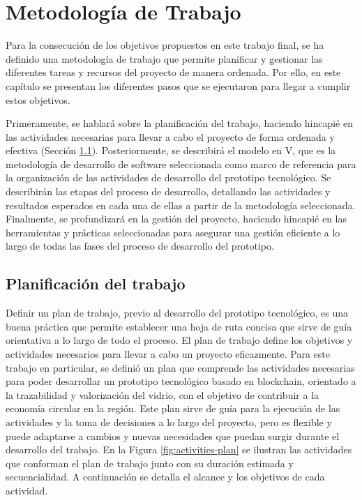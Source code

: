 \chapter[Metodología de trabajo]{Metodología de Trabajo}
\label{cp:methodology}

\parindent0pt

Para la consecución de los objetivos propuestos en este trabajo final, se ha definido una metodología de trabajo que permite planificar y gestionar las diferentes tareas y recursos del proyecto de manera ordenada. Por ello, en este capítulo se presentan los diferentes pasos que se ejecutaron para llegar a cumplir estos objetivos. 

Primeramente, se hablará sobre la planificación del trabajo, haciendo hincapié en las actividades necesarias para llevar a cabo el proyecto de forma ordenada y efectiva (Sección \ref{sec:work-plan}). Posteriormente, se describirá el modelo en V, que es la metodología de desarrollo de software seleccionada como marco de referencia para la organización de las actividades de desarrollo del prototipo tecnológico. Se describirán las etapas del proceso de desarrollo, detallando las actividades y resultados esperados en cada una de ellas a partir de la metodología seleccionada. Finalmente, se profundizará en la gestión del proyecto, haciendo hincapié en las herramientas y prácticas seleccionadas para asegurar una gestión eficiente a lo largo de todas las fases del proceso de desarrollo del prototipo.

\section{Planificación del trabajo}
\label{sec:work-plan}

Definir un plan de trabajo, previo al desarrollo del prototipo tecnológico, es una buena práctica que permite establecer una hoja de ruta concisa que sirve de guía orientativa a lo largo de todo el proceso. El plan de trabajo define los objetivos y actividades necesarios para llevar a cabo un proyecto eficazmente. Para este trabajo en particular, se definió un plan que comprende las actividades necesarias para poder desarrollar un prototipo tecnológico basado en blockchain, orientado a la trazabilidad y valorización del vidrio, con el objetivo de contribuir a la economía circular en la región. Este plan sirve de guía para la ejecución de las actividades y la toma de decisiones a lo largo del proyecto, pero es flexible y puede adaptarse a cambios y nuevas necesidades que puedan surgir durante el desarrollo del trabajo. En la Figura \ref{fig:activities-plan} se ilustran las actividades que conforman el plan de trabajo junto con su duración estimada y secuencialidad. A continuación se detalla el alcance y los objetivos de cada actividad.

